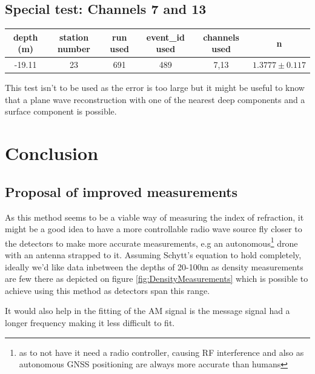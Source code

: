 \documentclass[11pt,a4paper,faculty=we,language=en,doctype=report]{cls/ugent-doc}
\begin{document}
\section{Special test: Channels 7 and 13}
\begin{table}[h]
    \centering
    \begin{tabular}{c|c|c|c|c|c}
      depth (m)& station number & run used & event\_id used & channels used & n\\
      \hline
      -19.11& 23 & 691 & 489 & 7,13 & $1.3777 \pm 0.117$
    \end{tabular}
\end{table}
This test isn't to be used as the error is too large but it might be useful
to know that a plane wave reconstruction with one of the nearest deep components and
a surface component is possible.

\chapter*{Conclusion}
\section*{Proposal of improved measurements}
As this method seems to be a viable way of measuring the index of refraction,
it might be a good idea to have a more controllable radio wave source fly
closer to the detectors to make more accurate measurements, e.g an
autonomous\footnote{as to not have it need a radio controller, causing RF interference 
and also as autonomous GNSS positioning are always more accurate than humans} drone with an
antenna strapped to it.  Assuming Schytt's equation to hold completely, ideally
we'd like data inbetween the depths of 20-100m as density measurements are few
there as depicted on figure \ref{fig:DensityMeasurements} which is possible to
achieve using this method as detectors span this range.

It would also help in the fitting of the AM signal is the message signal had a longer frequency
making it less difficult to fit.

\appendix
\end{document}
